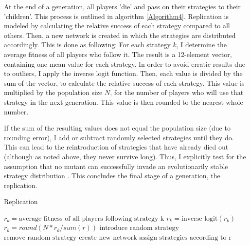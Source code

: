 \documentclass{JASSS}
\begin{document}
At the end of a generation, all players 'die' and pass on their strategies to their 'children'. This process is outlined in algorithm \ref{Algorithm4}. Replication is modeled by calculating the relative success of each strategy compared to all others. Then, a new network is created in which the strategies are distributed accordingly. This is done as following: For each strategy $k$, I determine the average fitness of all players who follow it. The result is a 12-element vector, containing one mean value for each strategy. In order to avoid erratic results due to outliers, I apply the inverse logit function. Then, each value is divided by the sum of the vector, to calculate the relative success of each strategy. This value is multiplied by the population size $N$, for the number of players who will use that strategy in the next generation. This value is then rounded to the nearest whole number.

If the sum of the resulting values does not equal the population size (due to rounding error), I add or subtract randomly selected strategies until they do. This can lead to the reintroduction of strategies that have already died out (although as noted above, they never survive long). Thus, I explicitly test for the assumption that no mutant can successfully invade an evolutionarily stable strategy distribution \citep{hamilton1964_2}. This concludes the final stage of a generation, the replication.

\begin{algorithm}
	\caption{Replication}
	\label{Algorithm4}
	\begin{algorithmic}[1]
		\State $r_k=\text{average fitness of all players following strategy k}$
		\State $r_k=\text{inverse logit}(r_k)$
		\EndFor
		\State $r_k=round(N*r_{k}/sum(r))$
		\EndFor
		\State $\text{introduce random strategy}$
		\EndWhile
		\State $\text{remove random strategy}$
		\EndWhile
		\State $\text{create new network}$
		\State $\text{assign strategies according to r}$
		\EndFunction
	\end{algorithmic}
\end{algorithm}

\FloatBarrier
\end{document}

